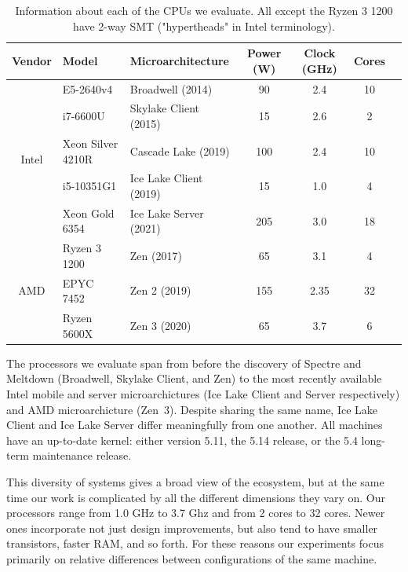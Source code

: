 \begin{table}[t]
    \begin{center}
    \begin{tabular}{ cllcccc }
      \textbf{Vendor} & \textbf{Model} & \textbf{Microarchitecture} & \textbf{Power (W)} & \textbf{Clock (GHz)} & \textbf{Cores} \\ \hline 
        \multirow{5}{*}{Intel} & E5-2640v4         & Broadwell (2014)          & 90 & 2.4 & 10 \\
                               & i7-6600U          & Skylake Client (2015)   & 15 & 2.6 & 2 \\
                               & Xeon Silver 4210R & Cascade Lake (2019)       & 100 & 2.4 & 10 \\
                               & i5-10351G1        & Ice Lake Client (2019)  & 15 & 1.0 & 4 \\
                               & Xeon Gold 6354    & Ice Lake Server (2021)  & 205 & 3.0 & 18 \\ \hline
        \multirow{3}{*}{AMD}   & Ryzen 3 1200      & Zen (2017)                & 65 & 3.1 & 4 \\
                               & EPYC 7452         & Zen 2 (2019)              & 155 & 2.35 & 32 \\
                               & Ryzen 5600X       & Zen 3 (2020)              & 65 & 3.7 & 6 \\ \hline
    \end{tabular}
    \end{center}
    \caption{Information about each of the CPUs we evaluate. All except the Ryzen 3 1200 have 2-way SMT ("hypertheads" in Intel terminology).}
    \label{fig:cpus}
  \end{table}

The processors we evaluate span from before the discovery of Spectre and Meltdown (Broadwell, Skylake Client, and Zen) to the most recently available Intel mobile and server microarchictures (Ice Lake Client and Server respectively) and AMD microarchicture (Zen~3).
Despite sharing the same name, Ice Lake Client and Ice Lake Server differ meaningfully from one another.
All machines have an up-to-date kernel: either version 5.11, the 5.14 release, or the 5.4 long-term maintenance release.

This diversity of systems gives a broad view of the ecosystem, but at the same time our work is complicated by all the different dimensions they vary on.
Our processors range from 1.0 GHz to 3.7 Ghz and from 2 cores to 32 cores.
Newer ones incorporate not just design improvements, but also tend to have smaller transistors, faster RAM, and so forth.
For these reasons our experiments focus primarily on relative differences between configurations of the same machine.

